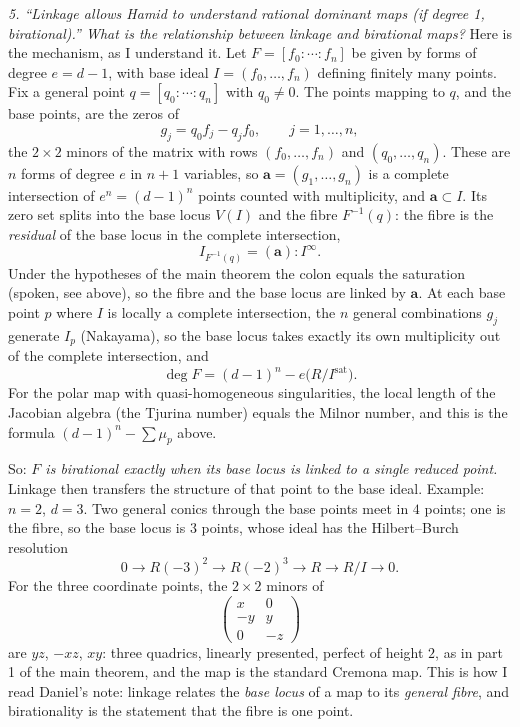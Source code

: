 \medskip\noindent
{\it 5. ``Linkage allows Hamid to understand
rational dominant maps (if degree 1,
birational).'' What is the relationship
between linkage and birational maps?}
Here is the mechanism, as I understand it.
Let $F = [f_0 : \cdots : f_n]$ be given by
forms of degree $e = d-1$, with base ideal
$I = (f_0, \ldots, f_n)$ defining finitely
many points. Fix a general point
$q = [q_0 : \cdots : q_n]$ with
$q_0 \neq 0$. The points mapping to $q$, and
the base points, are the zeros of
$$
g_j = q_0 f_j - q_j f_0,
\qquad j = 1, \ldots, n,
$$
the $2 \times 2$ minors of the matrix with
rows $(f_0, \ldots, f_n)$ and
$(q_0, \ldots, q_n)$. These are $n$ forms of
degree $e$ in $n+1$ variables, so
$\mathbf a = (g_1, \ldots, g_n)$ is a
complete intersection of $e^n = (d-1)^n$
points counted with multiplicity, and
$\mathbf a \subset I$. Its zero set splits
into the base locus $V(I)$ and the fibre
$F^{-1}(q)$: the fibre is the
\emph{residual} of the base locus in the
complete intersection,
$$
I_{F^{-1}(q)} = (\mathbf a) : I^\infty .
$$
Under the hypotheses of the main theorem the
colon equals the saturation (spoken, see
above), so the fibre and the base locus are
linked by $\mathbf a$. At each base point
$p$ where $I$ is locally a complete
intersection, the $n$ general combinations
$g_j$ generate $I_p$ (Nakayama), so the base
locus takes exactly its own multiplicity out
of the complete intersection, and
$$
\deg F
= (d-1)^n - e\big(R/I^{\mathrm{sat}}\big).
$$
For the polar map with quasi-homogeneous
singularities, the local length of the
Jacobian algebra (the Tjurina number) equals
the Milnor number, and this is the formula
$(d-1)^n - \sum \mu_p$ above.

So: \emph{$F$ is birational exactly when its
base locus is linked to a single reduced
point.} Linkage then transfers the structure
of that point to the base ideal. Example:
$n = 2$, $d = 3$. Two general conics through
the base points meet in $4$ points; one is
the fibre, so the base locus is $3$ points,
whose ideal has the Hilbert--Burch
resolution
$$
0 \to R(-3)^2 \to R(-2)^3 \to R
\to R/I \to 0 .
$$
For the three coordinate points, the
$2 \times 2$ minors of
$$
\begin{pmatrix}
x & 0 \\
-y & y \\
0 & -z
\end{pmatrix}
$$
are $yz$, $-xz$, $xy$: three quadrics,
linearly presented, perfect of height $2$,
as in part 1 of the main theorem, and the map
is the standard Cremona map. This is how I
read Daniel's note: linkage relates the
\emph{base locus} of a map to its
\emph{general fibre}, and birationality is
the statement that the fibre is one point.

